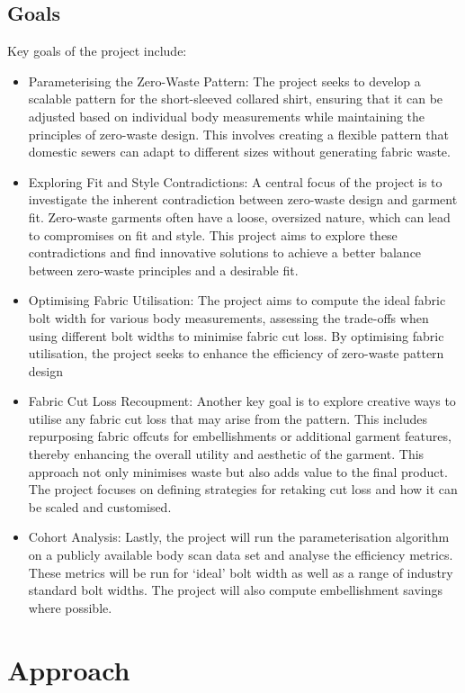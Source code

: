 \subsection{Goals}
Key goals of the project include:
\begin{itemize}
    \item Parameterising the Zero-Waste Pattern: The project seeks to develop a scalable pattern for the short-sleeved collared shirt, ensuring that it can be adjusted based on individual body measurements while maintaining the principles of zero-waste design. This involves creating a flexible pattern that domestic sewers can adapt to different sizes without generating fabric waste.
    \item Exploring Fit and Style Contradictions: A central focus of the project is to investigate the inherent contradiction between zero-waste design and garment fit. Zero-waste garments often have a loose, oversized nature, which can lead to compromises on fit and style. This project aims to explore these contradictions and find innovative solutions to achieve a better balance between zero-waste principles and a desirable fit.
    \item Optimising Fabric Utilisation: The project aims to compute the ideal fabric bolt width for various body measurements, assessing the trade-offs when using different bolt widths to minimise fabric cut loss. By optimising fabric utilisation, the project seeks to enhance the efficiency of zero-waste pattern design
    \item Fabric Cut Loss Recoupment: Another key goal is to explore creative ways to utilise any fabric cut loss that may arise from the pattern. This includes repurposing fabric offcuts for embellishments or additional garment features, thereby enhancing the overall utility and aesthetic of the garment. This approach not only minimises waste but also adds value to the final product. The project focuses on defining strategies for retaking cut loss and how it can be scaled and customised.
    \item Cohort Analysis: Lastly, the project will run the parameterisation algorithm on a publicly available body scan data set and analyse the efficiency metrics. These metrics will be run for ‘ideal’ bolt width as well as a range of industry standard bolt widths. The project will also compute embellishment savings where possible.
\end{itemize}

\section{Approach}

